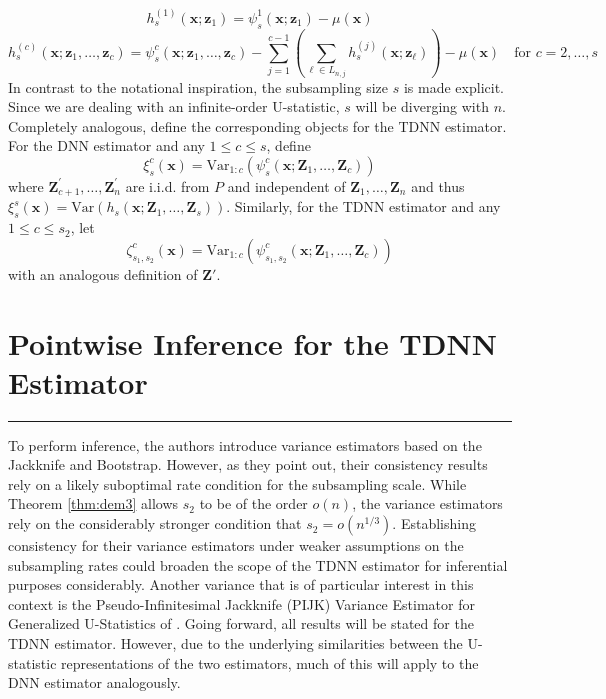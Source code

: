 \documentclass[letterpaper,10pt]{article}
\numberwithin{equation}{section}
\numberwithin{thm}{section}
\numberwithin{lem}{section}
\numberwithin{cor}{section}
\newcommand{\1}{\mathbbm{1}}
\newcommand{\Var}{\text{Var}}
\begin{document}
\begin{equation}
	h_{s}^{(1)}\left(\mathbf{x}; \mathbf{z}_{1}\right)
	= \psi_{s}^{1}(\mathbf{x}; \mathbf{z}_{1}) - \mu(\mathbf{x})
\end{equation}
\begin{equation}
	h_{s}^{(c)}\left(\mathbf{x}; \mathbf{z}_{1}, \dotsc, \mathbf{z}_{c}\right)
	= \psi_{s}^{c}(\mathbf{x}; \mathbf{z}_{1}, \dotsc, \mathbf{z}_{c}) - \sum_{j = 1}^{c-1}\left(\sum_{\ell \in L_{n,j}}h_{s}^{(j)}(\mathbf{x}; \mathbf{z}_{\ell})\right) - \mu(\mathbf{x})
	\quad \text{for } c = 2, \dotsc, s
\end{equation}
In contrast to the notational inspiration, the subsampling size $s$ is made explicit.
Since we are dealing with an infinite-order U-statistic, $s$ will be diverging with $n$.
Completely analogous, define the corresponding objects for the TDNN estimator.
For the DNN estimator and any $1 \leq c \leq s$, define
\begin{equation}\label{eq:xi_s_c}
	\xi_{s}^{c}\left(\mathbf{x}\right)
	= \Var_{1:c}\left(\psi_{s}^{c}(\mathbf{x}; \mathbf{Z}_{1}, \dotsc, \mathbf{Z}_{c})\right)
\end{equation}
where $\mathbf{Z}_{c+1}^{\prime}, \ldots, \mathbf{Z}_n^{\prime}$ are i.i.d. from $P$ and independent of $\mathbf{Z}_1, \ldots, \mathbf{Z}_n$ and thus
$\xi_{s}^{s}\left(\mathbf{x}\right) = \Var\left(h_s\left(\mathbf{x}; \mathbf{Z}_1, \ldots, \mathbf{Z}_s\right)\right).$
Similarly, for the TDNN estimator and any $1 \leq c \leq s_2$, let
\begin{equation}\label{eq:zeta_s1s2_c}
	\zeta_{s_1, s_2}^{c}\left(\mathbf{x}\right)
	= \Var_{1:c}\left(\psi_{s_1, s_2}^{c}(\mathbf{x}; \mathbf{Z}_{1}, \dotsc, \mathbf{Z}_{c})\right)
\end{equation}
with an analogous definition of $\mathbf{Z}'$.


\newpage
\section{Pointwise Inference for the TDNN Estimator}\label{sec:pw_inf}
\hrule
To perform inference, the authors introduce variance estimators based on the Jackknife and Bootstrap.
However, as they point out, their consistency results rely on a likely suboptimal rate condition for the subsampling scale.
While Theorem \ref{thm:dem3} allows $s_2$ to be of the order $o(n)$, the variance estimators rely on the considerably stronger condition that $s_2 = o(n^{1/3})$.
Establishing consistency for their variance estimators under weaker assumptions on the subsampling rates could broaden the scope of the TDNN estimator for inferential purposes considerably.
Another variance that is of particular interest in this context is the Pseudo-Infinitesimal Jackknife (PIJK) Variance Estimator for Generalized U-Statistics of \citet{peng_bias_2021}.
Going forward, all results will be stated for the TDNN estimator.
However, due to the underlying similarities between the U-statistic representations of the two estimators, much of this will apply to the DNN estimator analogously.
\end{document}
